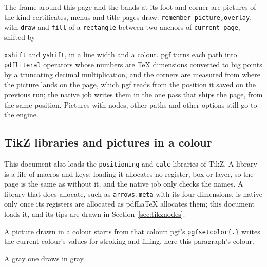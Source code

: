 \documentclass{article}
\numberwithin{equation}{section}
\theoremstyle{definition}
\theoremstyle{remark}
\begin{document}
The frame around this page and the bands at its foot and corner are pictures of the kind
certificates, menus and title pages draw: \texttt{remember picture,overlay}, with
\texttt{draw} and \texttt{fill} of a \texttt{rectangle} between two anchors of
\texttt{current page}, shifted by
 \texttt{xshift} and \texttt{yshift}, in a line width and a colour. pgf
turns each path into \texttt{pdfliteral} operators whose numbers are \TeX{} dimensions
converted to big points by a truncating decimal multiplication, and the corners are
measured from where the picture lands on the page, which pgf reads from the position it
saved on the previous run; the native job writes them in the one pass that ships the page,
from the same position. Pictures with nodes, other paths and other options still go to the
engine.

\subsection{TikZ libraries and pictures in a colour}\label{sec:tikzlib}
{\color{rtdeep}This document also loads the \texttt{positioning} and \texttt{calc} libraries
of TikZ. A library is a file of macros and keys: loading it allocates no register, box or
layer, so the page is the same as without it, and the native job only checks the names.
A library that does allocate, such as \texttt{arrows.meta} with its four dimensions, is
native only once its registers are allocated as pdfLaTeX allocates them; this document
loads it, and its tips are drawn in Section~\ref{sec:tikznodes}.
%
A picture drawn in a colour starts from that colour: pgf's \texttt{pgfsetcolor\{.\}} writes
the current colour's values for stroking and filling, here this paragraph's colour.}
{\color{gray}A gray one draws in gray.}
\end{document}
